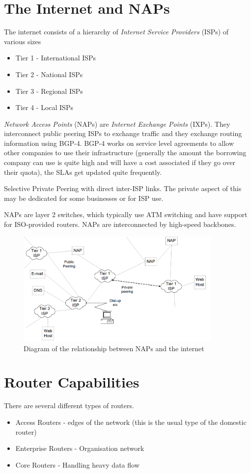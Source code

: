 \section*{The Internet and NAPs}
The internet consists of a hierarchy of \textit{Internet Service Providers} (ISPs) of various sizes
\begin{itemize}
    \item Tier 1 - International ISPs
    \item Tier 2 - National ISPs
    \item Tier 3 - Regional ISPs
    \item Tier 4 - Local ISPs
\end{itemize}

\textit{Network Access Points} (NAPs) are \textit{Internet Exchange Points} (IXPs). They interconnect public peering ISPs to exchange traffic and they exchange routing information using BGP-4. BGP-4 works on service level agreements to allow other companies to use their infrastructure (generally the amount the borrowing company can use is quite high and will have a cost associated if they go over their quota), the SLAs get updated quite frequently. 

Selective Private Peering with direct inter-ISP links. The private aspect of this may be dedicated for some businesses or for ISP use.

NAPs are layer 2 switches, which typically use ATM switching and have support for ISO-provided routers. NAPs are interconnected by high-speed backbones.
\begin{figure}[ht]
    \centering
    \includegraphics[width=0.9\textwidth]{assets/internet-nap.png}
    \caption*{Diagram of the relationship between NAPs and the internet}
\end{figure}

\section*{Router Capabilities}
There are several different types of routers.
\begin{itemize}
    \item Access Routers - edges of the network (this is the usual type of the domestic router)
    \item Enterprise Routers - Organisation network
    \item Core Routers - Handling heavy data flow
\end{itemize}

